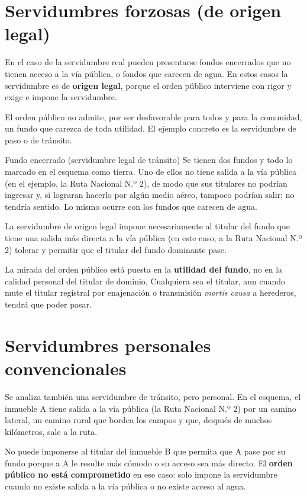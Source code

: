 \documentclass[12pt,oneside]{book}
\begin{document}
\section{Servidumbres forzosas (de origen legal)}

En el caso de la servidumbre real pueden presentarse fondos encerrados que no tienen acceso a la vía pública, o fondos que carecen de agua. En estos casos la servidumbre es de \textbf{origen legal}, porque el orden público interviene con rigor y exige e impone la servidumbre.

El orden público no admite, por ser desfavorable para todos y para la comunidad, un fundo que carezca de toda utilidad. El ejemplo concreto es la servidumbre de paso o de tránsito.

\begin{example}{Fundo encerrado (servidumbre legal de tránsito)}
Se tienen dos fundos y todo lo marcado en el esquema como tierra. Uno de ellos no tiene salida a la vía pública (en el ejemplo, la Ruta Nacional N.º 2), de modo que sus titulares no podrían ingresar y, si lograran hacerlo por algún medio aéreo, tampoco podrían salir; no tendría sentido. Lo mismo ocurre con los fundos que carecen de agua.

La servidumbre de origen legal impone necesariamente al titular del fundo que tiene una salida más directa a la vía pública (en este caso, a la Ruta Nacional N.º 2) tolerar y permitir que el titular del fundo dominante pase.
\end{example}

\begin{important}
La mirada del orden público está puesta en la \textbf{utilidad del fundo}, no en la calidad personal del titular de dominio. Cualquiera sea el titular, aun cuando mute el titular registral por enajenación o transmisión \emph{mortis causa} a herederos, tendrá que poder pasar.
\end{important}

\section{Servidumbres personales convencionales}

Se analiza también una servidumbre de tránsito, pero personal. En el esquema, el inmueble A tiene salida a la vía pública (la Ruta Nacional N.º 2) por un camino lateral, un camino rural que bordea los campos y que, después de muchos kilómetros, sale a la ruta.

No puede imponerse al titular del inmueble B que permita que A pase por su fundo porque a A le resulte más cómodo o su acceso sea más directo. El \textbf{orden público no está comprometido} en ese caso: solo impone la servidumbre cuando no existe salida a la vía pública o no existe acceso al agua.
\end{document}

